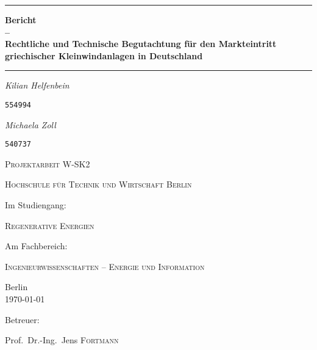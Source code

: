 \begin{titlepage}
	\centering
	\par\noindent\rule{\textwidth}{0.4pt}
	{\huge\bfseries Bericht\\
	{--}\\
	Rechtliche und Technische Begutachtung für den Markteintritt griechischer Kleinwindanlagen in Deutschland\par}
	\par\noindent\rule{\textwidth}{0.4pt}\par
	\vspace*{2cm}
	{\Large\itshape Kilian Helfenbein\par}
	{\Large \texttt{554994}\par}
	{\Large\itshape Michaela Zoll\par}
	{\Large \texttt{540737}\par}
	\vspace{1.5cm}
	{\scshape\Large Projektarbeit W-SK2\par}
	\vspace{1.5cm}
	{\scshape\LARGE Hochschule für Technik und Wirtschaft Berlin \par}
	\vspace{1cm}
	Im Studiengang:\par
	{\scshape\large Regenerative Energien\par}
	\vspace{.5cm}
	Am Fachbereich:\par
	{\scshape\large Ingenieurwissenschaften {--} Energie und Information\par}
	\vfill
	{\large Berlin\\
	\today\par}
	\vfill
	Betreuer:\par
	Prof.~Dr.-Ing.~Jens \textsc{Fortmann}\\
\end{titlepage}